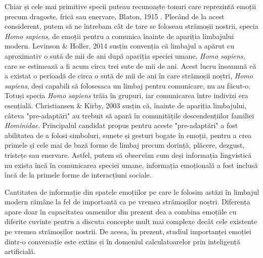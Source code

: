 \documentclass[a4paper,12pt]{book}
\begin{document}
				Chiar și cele mai primitive specii puteau recunoaște tonuri care reprezintă emoții precum dragoste, frică sau enervare, Blaton, 1915 \cite{blanton}. Plecând de la acest considerent, putem să ne întrebam cât de tare se foloseau strămoșii nostrii, specia \textit{Homo sapiens}, de emoții pentru a comunica înainte de apariția limbajului modern.  Levinson \& Holler, 2014 \cite{leviholler} susțin convenția că limbajul a apărut cu aproximativ o sută de mii de ani după apariția speciei umane, \textit{Homo sapiens}, care se estimează a fi acum circa trei sute de mii de ani. Acest lucru înseamnă că a existat o perioadă de circa o sută de mii de ani în care strămoșii noștri, \textit{Homo sapiens}, deși capabili să folosesaca un limbaj pentru comunicare, nu au făcut-o. Totuși specia \textit{Homo sapiens} trăia în grupuri, iar comunicarea între indivizi era esențială. Christiansen \& Kirby, 2003 \cite{chriskirbi} susțin că, înainte de apariția limbajului, câteva "pre-adaptări" au trebuit să apară în comunitățile descendențiilor familiei \textit{Hominidae}. Principalul candidat propus pentru aceste "pre-adaptări" a fost abilitatea de a folosi simboluri, sunete și gesturi bogate în emoții, pentru a crea primele și cele mai de bază forme de limbaj precum dorință, plăcere, dezgust, tristețe sau enervare. Astfel, putem să observăm cum deși informația lingvistică nu exista încă în comunicarea speciei umane, informația emoțională a fost inclusă încă de la primele forme de interacțiuni sociale.  \par					
				
				Cantitatea de informație din spatele emoțiilor pe care le folosim astăzi în limbajul modern rămâne la fel de importantă ca pe vremea strămoșilor noștri. Diferența apare doar în capacitatea oamenilor din prezent dea a combina emoțiile cu diferite cuvinte pentru a discuta concepte mult mai complexe decât cele existente pe vremea strămoșilor nostrii. De aceea, în prezent, studiul importanței emoției dintr-o conversație este extins și în domeniul calculatoarelor prin inteligență artificială. \par 	
				
\end{document}
